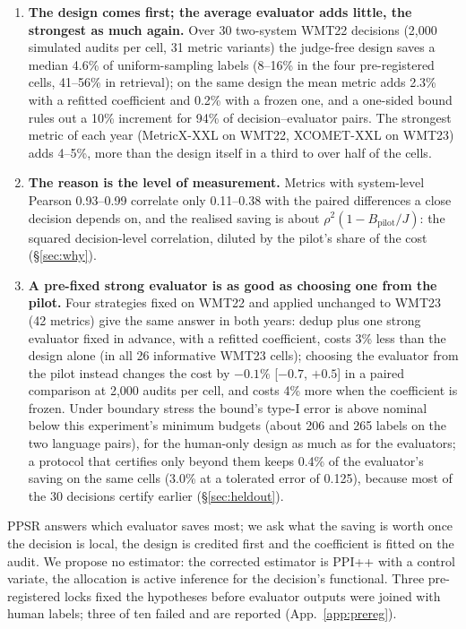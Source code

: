 \documentclass[11pt]{article}
\newcommand{\Bp}{B_{\mathrm{pilot}}}
\begin{document}
\begin{enumerate}
\item \textbf{The design comes first; the average evaluator adds little, the strongest as much again.} Over 30
two-system WMT22 decisions (2,000 simulated audits per cell, 31 metric variants) the judge-free design saves a median
4.6\% of uniform-sampling labels (8--16\% in the four pre-registered cells, 41--56\% in retrieval); on the same
design the mean metric adds 2.3\% with a refitted coefficient and 0.2\% with a frozen one, and a one-sided bound rules
out a 10\% increment for 94\% of decision--evaluator pairs. The strongest metric of each year (MetricX-XXL on WMT22,
XCOMET-XXL on WMT23) adds 4--5\%, more than the design itself in a third to over half of the cells.
\item \textbf{The reason is the level of measurement.} Metrics with system-level Pearson 0.93--0.99 correlate only
0.11--0.38 with the paired differences a close decision depends on, and the realised saving is about
$\rho^2(1-\Bp/J)$: the squared decision-level correlation, diluted by the pilot's share of the cost (\S\ref{sec:why}).
\item \textbf{A pre-fixed strong evaluator is as good as choosing one from the pilot.} Four strategies fixed on
WMT22 and applied unchanged to WMT23 (42 metrics) give the same answer in both years: dedup plus one strong evaluator
fixed in advance, with a refitted coefficient, costs 3\% less than the design alone (in all 26 informative WMT23 cells);
choosing the evaluator from the pilot instead changes the cost by $-0.1\%$ [$-0.7$, $+0.5$] in a paired comparison
at 2,000 audits per cell, and costs 4\% more when the coefficient is frozen. Under boundary stress the bound's type-I
error is above nominal below this experiment's minimum budgets (about 206 and 265 labels on the two language pairs),
for the human-only design as much as for the evaluators; a protocol that certifies only beyond them keeps 0.4\% of the
evaluator's saving on the same cells (3.0\% at a tolerated error of 0.125), because most of the 30 decisions certify
earlier (\S\ref{sec:heldout}).
\end{enumerate}
PPSR answers which evaluator saves most; we ask what the saving is worth once the decision is local, the design is
credited first and the coefficient is fitted on the audit. We propose no estimator: the corrected estimator is PPI++
with a control variate, the allocation is active inference \citep{zrnic2024active} for the decision's functional. Three
pre-registered locks fixed the hypotheses before evaluator outputs were joined with human labels; three of ten failed
and are reported (App.~\ref{app:prereg}).
\end{document}
